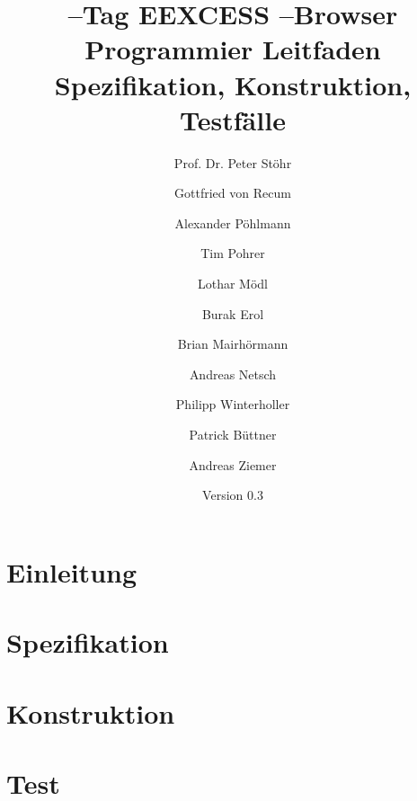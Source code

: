 \documentclass[
    DIV12,
    cleardouble=plain,
    headings=normal,
    pdftex,
    headexclude,footexclude,
    final
]{scrreprt}
\title{
  \SEARCH--Tag EEXCESS \SECH--Browser \\[1em]
  Programmier Leitfaden\\
Spezifikation, Konstruktion, Testfälle
}
\author{Prof. Dr. Peter Stöhr \and Gottfried von Recum \and Alexander Pöhlmann \and Tim Pohrer \and Lothar Mödl \and Burak Erol \and Brian Mairhörmann \and Andreas Netsch \and Philipp Winterholler \and Patrick Büttner \and Andreas Ziemer}
\date{Version 0.3}
\begin{document}
\maketitle
{}
\tableofcontents

\newpage
{}

\part{Einleitung}





\part{Spezifikation}





\part{Konstruktion}















\part{Test}


\newpage
\listoffigures
\listoftables
\end{document}
